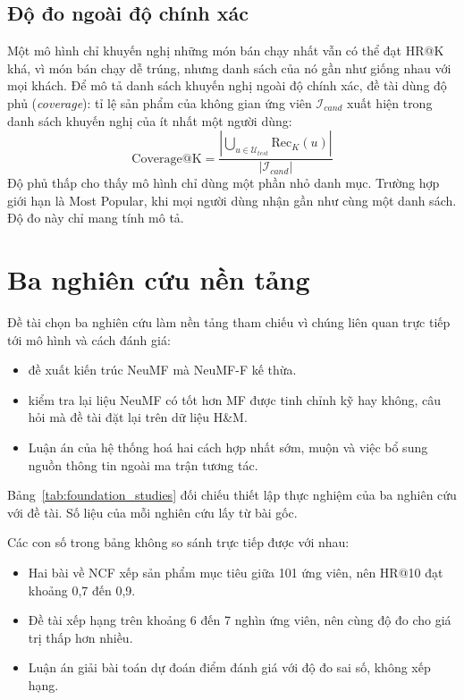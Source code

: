 \subsection{Độ đo ngoài độ chính xác}
\label{subsec:beyond_accuracy}

Một mô hình chỉ khuyến nghị những món bán chạy nhất vẫn có thể đạt HR@K khá, vì món bán chạy dễ trúng, nhưng danh sách của nó gần như giống nhau với mọi khách. Để mô tả danh sách khuyến nghị ngoài độ chính xác, đề tài dùng độ phủ (\textit{coverage}): tỉ lệ sản phẩm của không gian ứng viên $\mathcal{I}_{cand}$ xuất hiện trong danh sách khuyến nghị của ít nhất một người dùng:
\begin{equation}
    \text{Coverage@K} = \frac{\left| \bigcup_{u \in \mathcal{U}_{test}} \text{Rec}_K(u) \right|}{|\mathcal{I}_{cand}|}
    \label{eq:coverage}
\end{equation}
Độ phủ thấp cho thấy mô hình chỉ dùng một phần nhỏ danh mục. Trường hợp giới hạn là Most Popular, khi mọi người dùng nhận gần như cùng một danh sách. Độ đo này chỉ mang tính mô tả.

\section{Ba nghiên cứu nền tảng}
\label{sec:related_work}
\label{subsec:foundation_studies}

Đề tài chọn ba nghiên cứu làm nền tảng tham chiếu vì chúng liên quan trực tiếp tới mô hình và cách đánh giá:
\begin{itemize}
    \item \textcite{he2017ncf} đề xuất kiến trúc NeuMF mà NeuMF-F kế thừa.
    \item \textcite{rendle2020ncfmf} kiểm tra lại liệu NeuMF có tốt hơn MF được tinh chỉnh kỹ hay không, câu hỏi mà đề tài đặt lại trên dữ liệu H\&M.
    \item Luận án của \textcite{holinh2023multisource} hệ thống hoá hai cách hợp nhất sớm, muộn và việc bổ sung nguồn thông tin ngoài ma trận tương tác.
\end{itemize}

Bảng~\ref{tab:foundation_studies} đối chiếu thiết lập thực nghiệm của ba nghiên cứu với đề tài. Số liệu của mỗi nghiên cứu lấy từ bài gốc.

Các con số trong bảng không so sánh trực tiếp được với nhau:
\begin{itemize}
    \item Hai bài về NCF xếp sản phẩm mục tiêu giữa 101 ứng viên, nên HR@10 đạt khoảng 0,7 đến 0,9.
    \item Đề tài xếp hạng trên khoảng 6 đến 7 nghìn ứng viên, nên cùng độ đo cho giá trị thấp hơn nhiều.
    \item Luận án giải bài toán dự đoán điểm đánh giá với độ đo sai số, không xếp hạng.
\end{itemize}

